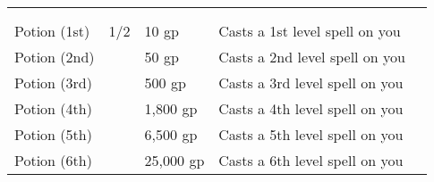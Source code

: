 
\begin{longtabuwrapper}
\begin{longtabu}{l l l X l}
 \\
 &  &  &  &  \\
\bottomrule
Potion (1st) & 1/2 & 10 gp & Casts a 1st level spell on you & \pageref{item:Potion (1st)} \\
Potion (2nd) &  & 50 gp & Casts a 2nd level spell on you & \pageref{item:Potion (2nd)} \\
Potion (3rd) &  & 500 gp & Casts a 3rd level spell on you & \pageref{item:Potion (3rd)} \\
Potion (4th) &  & 1,800 gp & Casts a 4th level spell on you & \pageref{item:Potion (4th)} \\
Potion (5th) &  & 6,500 gp & Casts a 5th level spell on you & \pageref{item:Potion (5th)} \\
Potion (6th) &  & 25,000 gp & Casts a 6th level spell on you & \pageref{item:Potion (6th)} \\
\end{longtabu}
\end{longtabuwrapper}
